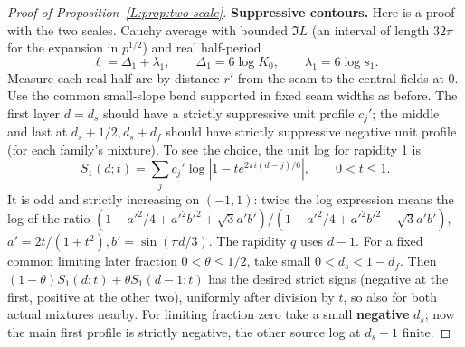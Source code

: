 \begin{proof}[Proof of Proposition~\ref{L:prop:two-scale}]
\textbf{Suppressive contours.}
Here is a proof with the two scales. Cauchy average with bounded \(\Im L\) (an interval of length \(32\pi\) for the expansion in \(p^{1/2}\)) and real half-period
\[
 \ell=\Delta_1+\lambda_1,\qquad \Delta_1=6\log K_0,\qquad \lambda_1=6\log s_1.
\]
Measure each real half arc by distance \(r'\) from the seam to the central fields at 0. Use the common small-slope bend supported in fixed seam widths as before. The first layer \(d=d_s\) should have a strictly suppressive unit profile \(c_j'\); the middle and last at \(d_s+1/2,d_s+d_f\) should have strictly suppressive negative unit profile (for each family's mixture). To see the choice, the unit log for rapidity 1 is
\[
 S_1(d;t)=\sum_j c_j'\log|1-t e^{2\pi i(d-j)/6}|,\qquad 0<t\le1 .
\]
It is odd and strictly increasing on \((-1,1)\): twice the log expression means the log of the ratio \((1-a'^2/4+a'^2 b'^2+\sqrt3 a'b')/(1-a'^2/4+a'^2 b'^2-\sqrt3 a'b')\), \(a'=2t/(1+t^2), b'=\sin(\pi d/3)\). The rapidity \(q\) uses \(d-1\). For a fixed common limiting later fraction \(0<\theta\le1/2\), take small \(0<d_s<1-d_f\). Then \((1-\theta)S_1(d;t)+\theta S_1(d-1;t)\) has the desired strict signs (negative at the first, positive at the other two), uniformly after division by \(t\), so also for both actual mixtures nearby. For limiting fraction zero take a small \textbf{negative} \(d_s\); now the main first profile is strictly negative, the other source log at \(d_s-1\) finite.


\end{proof}
